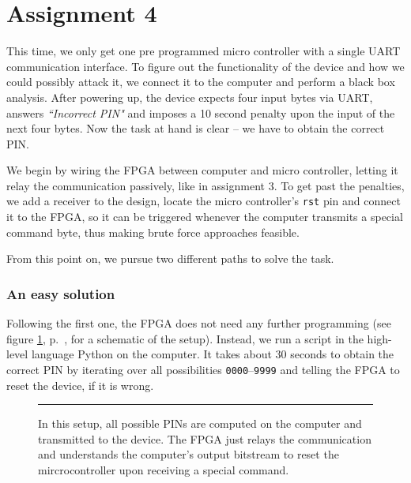 \section*{Assignment 4}


This time, we only get one pre programmed micro controller with a single UART communication interface. 
To figure out the functionality of the device and how we could possibly attack it, we connect it to the computer and perform a black box analysis.
After powering up, the device expects four input bytes via UART, answers \textit{``Incorrect PIN"} and imposes a 10 second penalty upon the input of the next four bytes. Now the task at hand is clear -- we have to obtain the correct PIN.

We begin by wiring the FPGA between computer and micro controller, letting it relay the communication passively, like in assignment 3.
To get past the penalties, we add a receiver to the design, locate the micro controller's \texttt{rst} pin and connect it to the FPGA, so it can be triggered whenever the computer transmits a special command byte, thus making brute force approaches feasible.

From this point on, we pursue two different paths to solve the task.

\subsubsection*{An easy solution}
Following the first one, the FPGA does not need any further programming (see figure \ref{fig:as4-schematic-1}, p.~\pageref{fig:as4-schematic-1}, for a schematic of the setup). Instead, we run a script in the high-level language Python on the computer. It takes about 30 seconds to obtain the correct PIN by iterating over all possibilities \texttt{0000}--\texttt{9999} and telling the FPGA to reset the device, if it is wrong.

\begin{figure}[tb]
    \begin{center}
        
        \caption{In this setup, all possible PINs are computed on the computer and transmitted to the device. The FPGA just relays the communication and understands the computer's output bitstream to reset the mircrocontroller upon receiving a special command.}
        \label{fig:as4-schematic-1}
        \vspace{1em}\hrule
    \end{center}
\end{figure}

